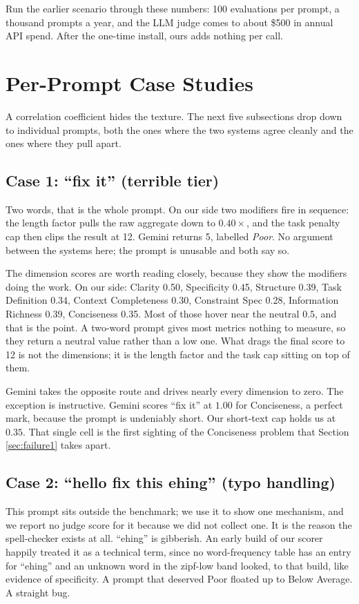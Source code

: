 \documentclass[conference]{IEEEtran}
\begin{document}
Run the earlier scenario through these numbers: 100 evaluations per prompt, a thousand prompts a year, and the LLM judge comes to about \$500 in annual API spend. After the one-time install, ours adds nothing per call.

\section{Per-Prompt Case Studies}
\label{sec:case_studies}

A correlation coefficient hides the texture. The next five subsections drop down to individual prompts, both the ones where the two systems agree cleanly and the ones where they pull apart.

\subsection{Case 1: ``fix it'' (terrible tier)}
Two words, that is the whole prompt. On our side two modifiers fire in sequence: the length factor pulls the raw aggregate down to $0.40 \times$, and the task penalty cap then clips the result at 12. Gemini returns 5, labelled \emph{Poor}. No argument between the systems here; the prompt is unusable and both say so.

The dimension scores are worth reading closely, because they show the modifiers doing the work. On our side: Clarity 0.50, Specificity 0.45, Structure 0.39, Task Definition 0.34, Context Completeness 0.30, Constraint Spec 0.28, Information Richness 0.39, Conciseness 0.35. Most of those hover near the neutral $0.5$, and that is the point. A two-word prompt gives most metrics nothing to measure, so they return a neutral value rather than a low one. What drags the final score to 12 is not the dimensions; it is the length factor and the task cap sitting on top of them.

Gemini takes the opposite route and drives nearly every dimension to zero. The exception is instructive. Gemini scores ``fix it'' at $1.00$ for Conciseness, a perfect mark, because the prompt is undeniably short. Our short-text cap holds us at $0.35$. That single cell is the first sighting of the Conciseness problem that Section \ref{sec:failure1} takes apart.

\subsection{Case 2: ``hello fix this ehing'' (typo handling)}
This prompt sits outside the benchmark; we use it to show one mechanism, and we report no judge score for it because we did not collect one. It is the reason the spell-checker exists at all. ``ehing'' is gibberish. An early build of our scorer happily treated it as a technical term, since no word-frequency table has an entry for ``ehing'' and an unknown word in the zipf-low band looked, to that build, like evidence of specificity. A prompt that deserved Poor floated up to Below Average. A straight bug.
\end{document}
